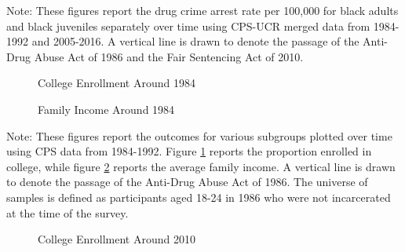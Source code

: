   \begin{footnotesize}
    \noindent Note: These figures report the drug crime arrest rate per 100,000 for black adults and black juveniles separately over time using CPS-UCR merged data from 1984-1992 and 2005-2016. A vertical line is drawn to denote the passage of the Anti-Drug Abuse Act of 1986 and the Fair Sentencing Act of 2010.
  \end{footnotesize}

  \clearpage


\begin{figure}[h]
    \centering
    \caption{College Enrollment Around 1984}%
    \qquad
    \label{fig:raw_college_1986}%
  \end{figure}
  
  \begin{figure}[h]
    \centering
    \caption{Family Income Around 1984}%
    \qquad
    \label{fig:raw_faminc_1986}%
  \end{figure}
  
  \begin{footnotesize}
    \noindent Note: These figures report the outcomes for various subgroups plotted over time using CPS data from 1984-1992. Figure \ref{fig:raw_college_1986} reports the proportion enrolled in college, while figure \ref{fig:raw_faminc_1986} reports the average family income. A vertical line is drawn to denote the passage of the Anti-Drug Abuse Act of 1986. The universe of samples is defined as participants aged 18-24 in 1986 who were not incarcerated at the time of the survey.
  \end{footnotesize}
  
  \clearpage
  
  
  \begin{figure}[h]
    \centering
    \caption{College Enrollment Around 2010}%
    \qquad
    \label{fig:raw_college_2010}%
  \end{figure}
  
